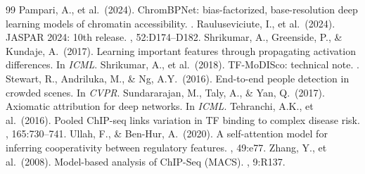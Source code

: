 \documentclass{article}
\begin{document}
\begin{thebibliography}{99}
Pampari, A., et al.\ (2024).
\newblock ChromBPNet: bias-factorized, base-resolution deep learning models of chromatin accessibility.
.
Rauluseviciute, I., et al.\ (2024).
\newblock JASPAR 2024: 10th release.
, 52:D174--D182.
Shrikumar, A., Greenside, P., \& Kundaje, A.\ (2017).
\newblock Learning important features through propagating activation differences.
\newblock In {\em ICML}.
Shrikumar, A., et al.\ (2018).
\newblock TF-MoDISco: technical note.
.
Stewart, R., Andriluka, M., \& Ng, A.Y.\ (2016).
\newblock End-to-end people detection in crowded scenes.
\newblock In {\em CVPR}.
Sundararajan, M., Taly, A., \& Yan, Q.\ (2017).
\newblock Axiomatic attribution for deep networks.
\newblock In {\em ICML}.
Tehranchi, A.K., et al.\ (2016).
\newblock Pooled ChIP-seq links variation in TF binding to complex disease risk.
, 165:730--741.
Ullah, F., \& Ben-Hur, A.\ (2020).
\newblock A self-attention model for inferring cooperativity between regulatory features.
, 49:e77.
Zhang, Y., et al.\ (2008).
\newblock Model-based analysis of ChIP-Seq (MACS).
, 9:R137.
\end{thebibliography}

\appendix
\end{document}

